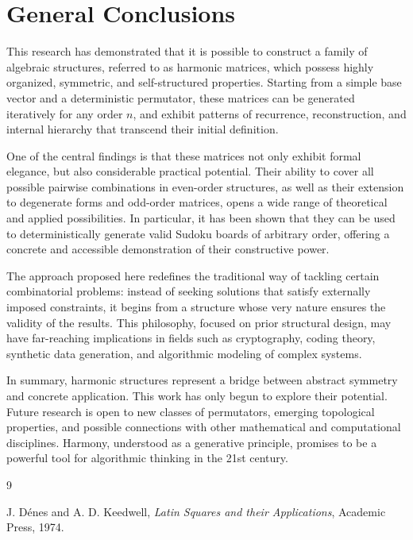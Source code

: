 \documentclass{article}
\begin{document}
\section{General Conclusions}

This research has demonstrated that it is possible to construct a family of algebraic structures, referred to as harmonic matrices, which possess highly organized, symmetric, and self-structured properties. Starting from a simple base vector and a deterministic permutator, these matrices can be generated iteratively for any order \(n\), and exhibit patterns of recurrence, reconstruction, and internal hierarchy that transcend their initial definition.

\medskip

One of the central findings is that these matrices not only exhibit formal elegance, but also considerable practical potential. Their ability to cover all possible pairwise combinations in even-order structures, as well as their extension to degenerate forms and odd-order matrices, opens a wide range of theoretical and applied possibilities. In particular, it has been shown that they can be used to deterministically generate valid Sudoku boards of arbitrary order, offering a concrete and accessible demonstration of their constructive power.

\medskip

The approach proposed here redefines the traditional way of tackling certain combinatorial problems: instead of seeking solutions that satisfy externally imposed constraints, it begins from a structure whose very nature ensures the validity of the results. This philosophy, focused on prior structural design, may have far-reaching implications in fields such as cryptography, coding theory, synthetic data generation, and algorithmic modeling of complex systems.

\medskip

In summary, harmonic structures represent a bridge between abstract symmetry and concrete application. This work has only begun to explore their potential. Future research is open to new classes of permutators, emerging topological properties, and possible connections with other mathematical and computational disciplines. Harmony, understood as a generative principle, promises to be a powerful tool for algorithmic thinking in the 21st century.



\begin{thebibliography}{9}

J. Dénes and A. D. Keedwell, \emph{Latin Squares and their Applications}, Academic Press, 1974.

\end{thebibliography}
\end{document}
